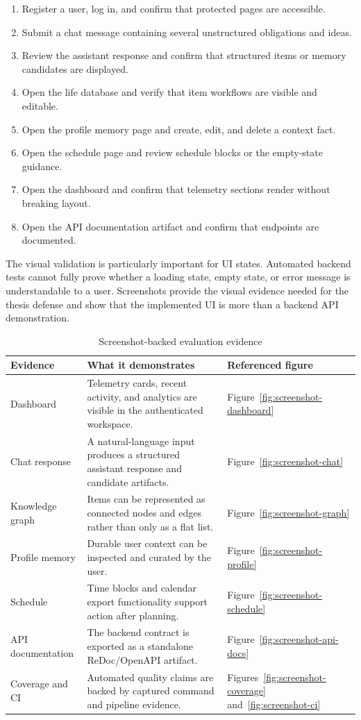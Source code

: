 \begin{enumerate}
  \item Register a user, log in, and confirm that protected pages are accessible.
  \item Submit a chat message containing several unstructured obligations and ideas.
  \item Review the assistant response and confirm that structured items or memory candidates are displayed.
  \item Open the life database and verify that item workflows are visible and editable.
  \item Open the profile memory page and create, edit, and delete a context fact.
  \item Open the schedule page and review schedule blocks or the empty-state guidance.
  \item Open the dashboard and confirm that telemetry sections render without breaking layout.
  \item Open the API documentation artifact and confirm that endpoints are documented.
\end{enumerate}

The visual validation is particularly important for UI states. Automated backend tests cannot fully prove whether a loading state, empty state, or error message is understandable to a user. Screenshots provide the visual evidence needed for the thesis defense and show that the implemented UI is more than a backend API demonstration.

\begin{longtable}{|p{}|p{}|p{}|}
\caption{Screenshot-backed evaluation evidence}
\label{tab:screenshot-evidence}\\
\hline
\textbf{Evidence} & \textbf{What it demonstrates} & \textbf{Referenced figure}\\
\hline
Dashboard & Telemetry cards, recent activity, and analytics are visible in the authenticated workspace. & Figure~\ref{fig:screenshot-dashboard}\\
\hline
Chat response & A natural-language input produces a structured assistant response and candidate artifacts. & Figure~\ref{fig:screenshot-chat}\\
\hline
Knowledge graph & Items can be represented as connected nodes and edges rather than only as a flat list. & Figure~\ref{fig:screenshot-graph}\\
\hline
Profile memory & Durable user context can be inspected and curated by the user. & Figure~\ref{fig:screenshot-profile}\\
\hline
Schedule & Time blocks and calendar export functionality support action after planning. & Figure~\ref{fig:screenshot-schedule}\\
\hline
API documentation & The backend contract is exported as a standalone ReDoc/OpenAPI artifact. & Figure~\ref{fig:screenshot-api-docs}\\
\hline
Coverage and CI & Automated quality claims are backed by captured command and pipeline evidence. & Figures~\ref{fig:screenshot-coverage} and~\ref{fig:screenshot-ci}\\
\hline
\end{longtable}

